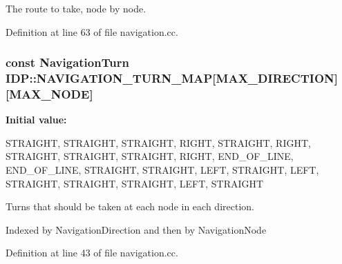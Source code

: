 The route to take, node by node. 



Definition at line 63 of file navigation.cc.

\hypertarget{namespaceIDP_a0bada0608b684564e235786b3b38c10a}{
\subsubsection[{NAVIGATION\_\-TURN\_\-MAP}]{\setlength{\rightskip}{0pt plus 5cm}const {\bf NavigationTurn} {\bf IDP::NAVIGATION\_\-TURN\_\-MAP}\mbox{[}MAX\_\-DIRECTION\mbox{]}\mbox{[}MAX\_\-NODE\mbox{]}}}
\label{namespaceIDP_a0bada0608b684564e235786b3b38c10a}
{\bfseries Initial value:}
\begin{DoxyCode}
 {
        {STRAIGHT, STRAIGHT, STRAIGHT, RIGHT, STRAIGHT, RIGHT, STRAIGHT,
            STRAIGHT, STRAIGHT, RIGHT, END_OF_LINE},
        {END_OF_LINE, STRAIGHT, STRAIGHT, LEFT, STRAIGHT, LEFT, STRAIGHT,
            STRAIGHT, STRAIGHT, LEFT, STRAIGHT}
    }
\end{DoxyCode}


Turns that should be taken at each node in each direction. 

Indexed by NavigationDirection and then by NavigationNode 

Definition at line 43 of file navigation.cc.

